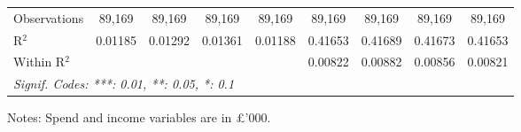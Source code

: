 \begin{table}[htbp]
\begin{threeparttable}[b]
\begin{tabular}{lcccccccc}
         Observations             & 89,169           & 89,169            & 89,169           & 89,169           & 89,169          & 89,169          & 89,169          & 89,169\\  
         R$^2$                    & 0.01185          & 0.01292           & 0.01361          & 0.01188          & 0.41653         & 0.41689         & 0.41673         & 0.41653\\  
         Within R$^2$             &                  &                   &                  &                  & 0.00822         & 0.00882         & 0.00856         & 0.00821\\  
         \midrule \midrule
         \multicolumn{9}{l}{\emph{Signif. Codes: ***: 0.01, **: 0.05, *: 0.1}}\\
      \end{tabular}
      
      \begin{tablenotes}\footnotesize
         \item Notes: Spend and income variables are in \pounds'000.
      \end{tablenotes}
   \end{threeparttable}
\end{table}


